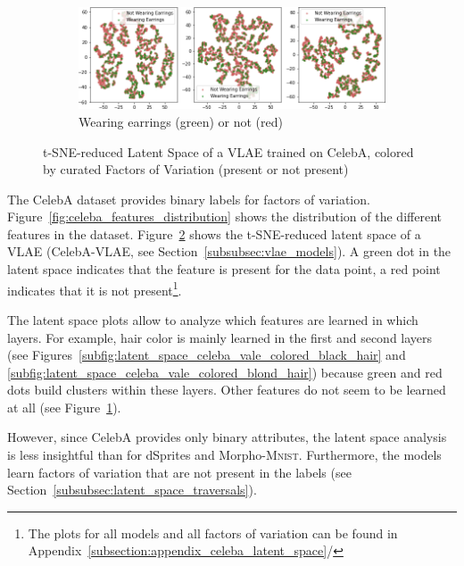 \begin{figure}
\begin{subfigure}{.49\textwidth}
        \includegraphics[width=\textwidth]{images/latent_spaces/celeba/vlae/vlae_celeba_Wearing_Earrings.png}
        \caption{Wearing earrings (green) or not (red)}
        \label{subfig:latent_space_celeba_vale_colored_wearing_earrings}
    \end{subfigure}
    \caption[\ac{VLAE} Latent Space for CelebA, Curated Features]{\ac{t-SNE}-reduced Latent Space of a \ac{VLAE} trained on CelebA, colored by curated Factors of Variation (present or not present)}
    \label{fig:latent_space_celeba_vale_colored}
\end{figure}

The CelebA dataset provides binary labels for factors of variation.
Figure~\ref{fig:celeba_features_distribution} shows the distribution of the different features in the dataset.
Figure~\ref{fig:latent_space_celeba_vale_colored} shows the \ac{t-SNE}-reduced latent space of a \ac{VLAE} (CelebA-\ac{VLAE}, see Section~\ref{subsubsec:vlae_models}).
A green dot in the latent space indicates that the feature is present for the data point, a red point indicates that it is not present\footnote{The plots for all models and all factors of variation can be found in Appendix~\ref{subsection:appendix_celeba_latent_space}/}.

The latent space plots allow to analyze which features are learned in which layers.
For example, hair color is mainly learned in the first and second layers (see Figures~\ref{subfig:latent_space_celeba_vale_colored_black_hair} and \ref{subfig:latent_space_celeba_vale_colored_blond_hair}) because green and red dots build clusters within these layers.
Other features do not seem to be learned at all (see Figure~\ref{subfig:latent_space_celeba_vale_colored_wearing_earrings}).

However, since CelebA provides only binary attributes, the latent space analysis is less insightful than for dSprites and Morpho-\textsc{Mnist}.
Furthermore, the models learn factors of variation that are not present in the labels (see Section~\ref{subsubsec:latent_space_traversals}).

